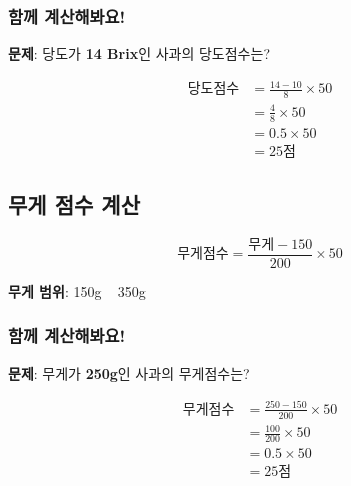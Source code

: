 \documentclass[12pt,a4paper]{article}
\begin{document}
\subsubsection*{ 함께 계산해봐요!}

\begin{tcolorbox}[colback=lightyellow,colframe=orange]
\textbf{문제}: 당도가 \textbf{14 Brix}인 사과의 당도점수는?

\large
\begin{align}
\text{당도점수} &= \frac{14 - 10}{8} \times 50 \\[0.3em]
&= \frac{4}{8} \times 50 \\[0.3em]
&= 0.5 \times 50 \\[0.3em]
&= \boxed{25\text{점}}
\end{align}
\normalsize
\end{tcolorbox}

\subsection{ 무게 점수 계산}

\begin{tcolorbox}[colback=lightblue,colframe=darkblue,title=\textbf{무게 점수 공식}]
\Large
\begin{equation}
\text{무게점수} = \frac{\text{무게} - 150}{200} \times 50
\end{equation}
\normalsize

\textbf{무게 범위}: 150g ~ 350g
\end{tcolorbox}

\subsubsection*{ 함께 계산해봐요!}

\begin{tcolorbox}[colback=lightyellow,colframe=orange]
\textbf{문제}: 무게가 \textbf{250g}인 사과의 무게점수는?

\large
\begin{align}
\text{무게점수} &= \frac{250 - 150}{200} \times 50 \\[0.3em]
&= \frac{100}{200} \times 50 \\[0.3em]
&= 0.5 \times 50 \\[0.3em]
&= \boxed{25\text{점}}
\end{align}
\normalsize
\end{tcolorbox}
\end{document}
